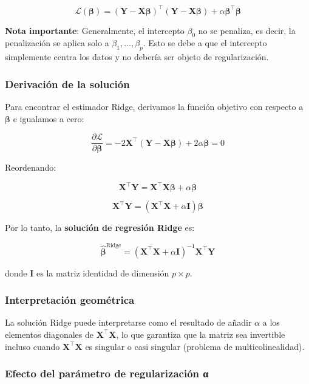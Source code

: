 \documentclass[
  doc,
  floatsintext,
  longtable,
  a4paper,
  nolmodern,
  notxfonts,
  notimes,
  12pt,
  colorlinks=true,linkcolor=blue,citecolor=blue,urlcolor=blue]{apa7}
\begin{document}
\[
\mathcal{L}(\boldsymbol{\beta}) = (\mathbf{Y} - \mathbf{X}\boldsymbol{\beta})^\top(\mathbf{Y} - \mathbf{X}\boldsymbol{\beta}) + \alpha \boldsymbol{\beta}^\top\boldsymbol{\beta}
\]

\textbf{Nota importante}: Generalmente, el intercepto \(\beta_0\) no se
penaliza, es decir, la penalización se aplica solo a
\(\beta_1, \ldots, \beta_p\). Esto se debe a que el intercepto
simplemente centra los datos y no debería ser objeto de regularización.

\subsubsection{Derivación de la
solución}\label{derivaciuxf3n-de-la-soluciuxf3n-1}

Para encontrar el estimador Ridge, derivamos la función objetivo con
respecto a \(\boldsymbol{\beta}\) e igualamos a cero:

\[
\frac{\partial \mathcal{L}}{\partial \boldsymbol{\beta}} = -2\mathbf{X}^\top(\mathbf{Y} - \mathbf{X}\boldsymbol{\beta}) + 2\alpha\boldsymbol{\beta} = 0
\]

Reordenando:

\[
\mathbf{X}^\top\mathbf{Y} = \mathbf{X}^\top\mathbf{X}\boldsymbol{\beta} + \alpha\boldsymbol{\beta}
\]

\[
\mathbf{X}^\top\mathbf{Y} = (\mathbf{X}^\top\mathbf{X} + \alpha\mathbf{I})\boldsymbol{\beta}
\]

Por lo tanto, la \textbf{solución de regresión Ridge} es:

\[
\hat{\boldsymbol{\beta}}^{\text{Ridge}} = (\mathbf{X}^\top\mathbf{X} + \alpha\mathbf{I})^{-1}\mathbf{X}^\top\mathbf{Y}
\]

donde \(\mathbf{I}\) es la matriz identidad de dimensión \(p \times p\).

\subsubsection{Interpretación
geométrica}\label{interpretaciuxf3n-geomuxe9trica}

La solución Ridge puede interpretarse como el resultado de añadir
\(\alpha\) a los elementos diagonales de \(\mathbf{X}^\top\mathbf{X}\),
lo que garantiza que la matriz sea invertible incluso cuando
\(\mathbf{X}^\top\mathbf{X}\) es singular o casi singular (problema de
multicolinealidad).

\subsubsection{Efecto del parámetro de regularización
α}\label{efecto-del-paruxe1metro-de-regularizaciuxf3n-ux3b1}
\end{document}
